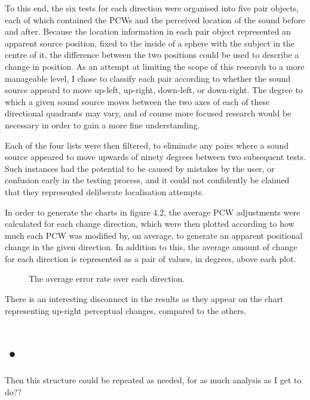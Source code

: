 To this end, the six tests for each direction were organised into five pair objects, each of which contained the PCWs and the perceived location of the sound before and after. Because the location information in each pair object represented an apparent source position, fixed to the inside of a sphere with the subject in the centre of it, the difference between the two positions could be used to describe a change in position. As an attempt at limiting the scope of this research to a more manageable level, I chose to classify each pair according to whether the sound source appeard to move up-left, up-right, down-left, or down-right. The degree to which a given sound source moves between the two axes of each of these directional quadrants may vary, and of course more focused research would be necessary in order to gain a more fine understanding. 

Each of the four lists were then filtered, to eliminate any pairs where a sound source appeared to move upwards of ninety degrees between two subsequent tests. Such instances had the potential to be caused by mistakes by the user, or confusion early in the testing process, and it could not confidently be claimed that they represented deliberate localisation attempts. 

In order to generate the charts in figure 4.2, the average PCW adjustments were calculated for each change direction, which were then plotted according to how much each PCW was modified by, on average, to generate an apparent positional change in the given direction. In addition to this, the average amount of change for each direction is represented as a pair of values, in degrees, above each plot.

\begin{figure}
	\caption{The average error rate over each direction.}
\end{figure}

There is an interesting disconnect in the results as they appear on the chart representing up-right perceptual changes, compared to the others. 

\section{•}
Then this structure could be repeated as needed, for as much analysis as I get to do??